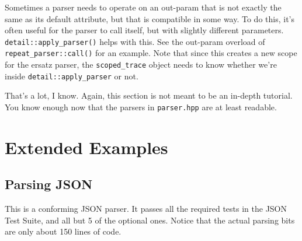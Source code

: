 Sometimes a parser needs to operate on an out-param that is not exactly the same as its default attribute, but that is compatible in some way. To do this, it's often useful for the parser to call itself, but with slightly different parameters. \texttt{detail::apply\_parser()} helps with this. See the out-param overload of \texttt{repeat\_parser::call()} for an example. Note that since this creates a new scope for the ersatz parser, the \texttt{scoped\_trace} object needs to know whether we're inside \texttt{detail::apply\_parser} or not.

That's a lot, I know. Again, this section is not meant to be an in-depth tutorial. You know enough now that the parsers in \texttt{parser.hpp} are at least readable.



\section{Extended Examples}



\subsection{Parsing JSON}

This is a conforming JSON parser. It passes all the required tests in the JSON Test Suite, and all but 5 of the optional ones. Notice that the actual parsing bits are only about 150 lines of code.

